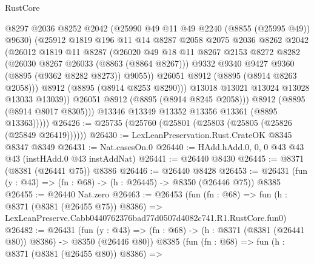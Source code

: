\begin{lexlean}{RustCore}
\begin{coremodule}
                      @8297
                      @2036
                      @8252
                      @2042
                      (@25990 @49 @11 @49 @2240 (@8855 (@25995 @49)) @9630)
                      (@25912
                        @1819
                        @196
                        @11
                        @14
                        @8287
                        @2058
                        @2075
                        @2036
                        @8262
                        @2042
                        (@26012
                          @1819
                          @11
                          @8287
                          (@26020
                            @49
                            @18
                            @11
                            @8267
                            @2153
                            @8272
                            @8282
                            (@26030 @8267 @26033 (@8863 (@8864 @8267)))
                            @9332
                            @9340
                            @9427
                            @9360
                            (@8895 (@9362 @8282 @8273))
                            @9055))
                        @26051
                        @8912
                        (@8895 (@8914 @8263 @2058)))
                      @8912
                      (@8895 (@8914 @8253 @8290)))
                    @13018
                    @13021
                    @13024
                    @13028
                    @13033
                    @13039))
                @26051
                @8912
                (@8895 (@8914 @8245 @2058)))
              @8912
              (@8895 (@8914 @8017 @8305)))
            @13346
            @13349
            @13352
            @13356
            @13361
            (@8895 @13363)))))
@26426 := @25735 (@25760 (@25801 (@25803 (@25805 (@25826 (@25849 @26419))))))
@26430 := LexLeanPreservation.Rust.CrateOK @8345 @8347 @8349
@26431 := Nat.casesOn.{0}
@26440 := HAdd.hAdd.{0, 0, 0} @43 @43 @43 (instHAdd.{0} @43 instAddNat)
@26441 := @26440 @8430
@26445 := @8371 (@8381 (@26441 @75)) @8386
@26446 := @26440 @8428
@26453 := @26431 (fun (y : @43) => (fn : @68) -> (h : @26445) -> @8350 (@26446 @75)) @8385
@26455 := @26440 Nat.zero
@26463 := @26453
    (fun (fn : @68) =>
    fun (h : @8371 (@8381 (@26455 @75)) @8386) =>
    LexLeanPreserve.Cabb0440762376bad77d0507d4082c741.R1.RustCore.fun0)
@26482 := @26431
    (fun (y : @43) => (fn : @68) -> (h : @8371 (@8381 (@26441 @80)) @8386) -> @8350 (@26446 @80))
    @8385
    (fun (fn : @68) =>
    fun (h : @8371 (@8381 (@26455 @80)) @8386) =>

\end{coremodule}
\end{lexlean}
